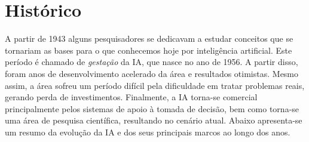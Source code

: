 \section{Histórico}

A partir de 1943 alguns pesquisadores se dedicavam a estudar conceitos que se tornariam as bases para o que conhecemos hoje por inteligência artificial. Este período é chamado de \textit{gestação} da IA, que nasce no ano de 1956. A partir disso, foram anos de desenvolvimento acelerado da área e resultados otimistas. Mesmo assim, a área sofreu um período difícil pela dificuldade em tratar problemas reais, gerando perda de investimentos. Finalmente, a IA torna-se comercial principalmente pelos sistemas de apoio à tomada de decisão, bem como torna-se uma área de pesquisa científica, resultando no cenário atual. Abaixo apresenta-se um resumo da evolução da IA e dos seus principais marcos ao longo dos anos.

\insertspace

